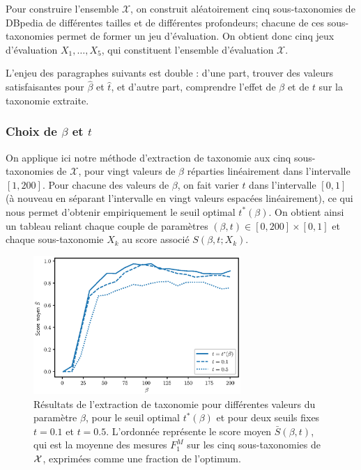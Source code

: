 Pour construire l'ensemble $\mathcal{X}$, on construit aléatoirement cinq sous-taxonomies de DBpedia de différentes tailles et de différentes profondeurs; chacune de ces sous-taxonomies permet de former un jeu d'évaluation. On obtient donc cinq jeux d'évaluation $X_1, \ldots, X_5$, qui constituent l'ensemble d'évaluation $\mathcal{X}$.


L'enjeu des paragraphes suivants est double : d'une part, trouver des valeurs satisfaisantes pour $\hat{\beta}$ et $\hat{t}$, et d'autre part, comprendre l'effet de $\beta$ et de $t$ sur la taxonomie extraite.

\subsubsection{Choix de \texorpdfstring{$\beta$}{beta} et \texorpdfstring{$t$}{t}}
\label{subsec:te-hp-values}

On applique ici notre méthode d'extraction de taxonomie aux cinq sous-taxonomies de $\mathcal{X}$, pour vingt valeurs de $\beta$ réparties linéairement dans l'intervalle $[1, 200]$. Pour chacune des valeurs de $\beta$, on fait varier $t$ dans l'intervalle $[0, 1]$ (à nouveau en séparant l'intervalle en vingt valeurs espacées linéairement), ce qui nous permet d'obtenir empiriquement le seuil optimal $t^*(\beta)$. On obtient ainsi un tableau reliant chaque couple de paramètres $(\beta, t) \in [0, 200] \times [0, 1]$  et chaque sous-taxonomie $X_k$ au score associé $S(\beta, t; X_k)$.


\begin{figure}[h]
    \centering
    \includegraphics[width=0.7\textwidth]{fig/plot/average_beta_vs_best_all_FR.eps}
    \caption[Influence du paramètre $\beta$]{Résultats de l'extraction de taxonomie pour différentes valeurs du paramètre $\beta$, pour le seuil optimal $t^*(\beta)$ et pour deux seuils fixes $t=0.1$ et $t=0.5$. 
    L'ordonnée représente le score moyen $\bar{S}(\beta, t)$, qui est la moyenne des mesures $F_1^M$ sur les cinq sous-taxonomies de $\cal{X}$, exprimées comme une fraction de l'optimum.
    }
    \label{fig:beta-search-1}
\end{figure}

